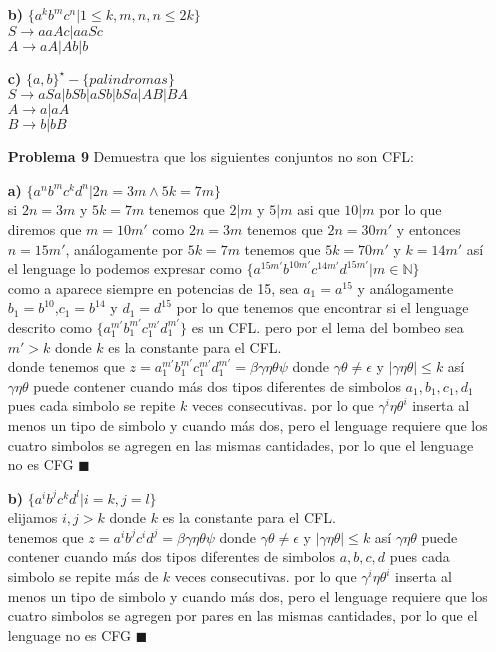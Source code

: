 \documentclass{article}
\begin{document}
\begin{enumerate}
\item[\bf{b)}]  $ \{a^{k}b^{m}c^{n}| 1 \le k,m,n, n\le 2k\}$\\

$S \rightarrow aaAc|aaSc $\\
$A \rightarrow aA|Ab|b $\\

\item[\bf{c)}]  $ \{a,b\}^{\star} - \{palindromas\}$\\

$S \rightarrow aSa| bSb | aSb | bSa | AB | BA $\\
$A \rightarrow a|aA $\\
$B \rightarrow b|bB $\\

\item[\bf{Problema 9}] Demuestra que los siguientes conjuntos no son CFL:
\item[\bf{a)}]  $\{a^{n}b^{m}c^{k}d^{n}| 2n=3m \wedge 5k=7m  \}$\\
si $2n=3m$ y $5k=7m$ tenemos que $2|m$ y $5|m$ asi que $10|m$ por lo que diremos que $m=10m'$
como $2n=3m$ tenemos que $2n=30m'$ y entonces $n=15m'$, análogamente por $5k=7m$ tenemos que $5k=70m'$ y $k=14m'$
así el lenguage lo podemos expresar como $\{a^{15m'}b^{10m'}c^{14m'}d^{15m'}| m \in \mathbb{N}  \}$\\
como a aparece siempre en potencias de 15, sea $a_1=a^{15}$ y análogamente $b_1=b^{10}$,$c_1=b^{14}$ y $d_1=d^{15}$
por lo que tenemos que encontrar si el lenguage descrito como $\{a_1^{m'}b_1^{m'}c_1^{m'}d_1^{m'}\}$ es un CFL.
pero por el lema del bombeo sea $m'>k$ donde $k$ es la constante para el CFL.\\
donde tenemos que $z= a_1^{m'}b_1^{m'}c_1^{m'}d_1^{m'} = \beta \gamma \eta \theta \psi $ donde $ \gamma \theta \ne \epsilon$ y $|\gamma \eta \theta | \le k$
así $\gamma \eta \theta$ puede contener cuando más dos tipos diferentes de simbolos $a_1,b_1,c_1,d_1$ pues cada simbolo se repite $k$ veces consecutivas.
por lo que $\gamma^i \eta \theta^i$ inserta al menos un tipo de simbolo y cuando más dos, pero el lenguage requiere que los cuatro simbolos se agregen en las mismas
cantidades, por lo que el lenguage no es CFG $\blacksquare$

\item[\bf{b)}]  $ \{a^{i}b^{j}c^{k}d^{l} | i=k, j=l \}$\\
elijamos $i,j > k$ donde $k$ es la constante para el CFL.\\
tenemos que $z= a^{i}b^{j}c^{i}d^{j} = \beta \gamma \eta \theta \psi $ donde $ \gamma \theta \ne \epsilon$ y $|\gamma \eta \theta | \le k$
así $\gamma \eta \theta$ puede contener cuando más dos tipos diferentes de simbolos $a,b,c,d$ pues cada simbolo se repite más de $k$ veces consecutivas.
por lo que $\gamma^i \eta \theta^i$ inserta al menos un tipo de simbolo y cuando más dos, pero el lenguage requiere que los cuatro simbolos se agregen por pares en las mismas
cantidades, por lo que el lenguage no es CFG $\blacksquare$




\end{enumerate}
\end{document}
